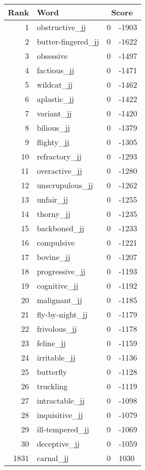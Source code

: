 \begin{longtable}[!htbp]{| rlr@{.}l |}
    \hline
    \textbf{Rank} & \textbf{Word} & \multicolumn{2}{c|}{\textbf{Score}} \\
    \hline
    \endhead
    1 & obstructive\_jj & 0 & -1903 \\
    2 & butter-fingered\_jj & 0 & -1622 \\
    3 & obsessive & 0 & -1497 \\
    4 & factious\_jj & 0 & -1471 \\
    5 & wildcat\_jj & 0 & -1462 \\
    6 & aplastic\_jj & 0 & -1422 \\
    7 & variant\_jj & 0 & -1420 \\
    8 & bilious\_jj & 0 & -1379 \\
    9 & flighty\_jj & 0 & -1305 \\
    10 & refractory\_jj & 0 & -1293 \\
    11 & overactive\_jj & 0 & -1280 \\
    12 & unscrupulous\_jj & 0 & -1262 \\
    13 & unfair\_jj & 0 & -1255 \\
    14 & thorny\_jj & 0 & -1235 \\
    15 & backboned\_jj & 0 & -1233 \\
    16 & compulsive & 0 & -1221 \\
    17 & bovine\_jj & 0 & -1207 \\
    18 & progressive\_jj & 0 & -1193 \\
    19 & cognitive\_jj & 0 & -1192 \\
    20 & malignant\_jj & 0 & -1185 \\
    21 & fly-by-night\_jj & 0 & -1179 \\
    22 & frivolous\_jj & 0 & -1178 \\
    23 & feline\_jj & 0 & -1159 \\
    24 & irritable\_jj & 0 & -1136 \\
    25 & butterfly & 0 & -1128 \\
    26 & truckling & 0 & -1119 \\
    27 & intractable\_jj & 0 & -1098 \\
    28 & inquisitive\_jj & 0 & -1079 \\
    29 & ill-tempered\_jj & 0 & -1069 \\
    30 & deceptive\_jj & 0 & -1059 \\
    1831 & carnal\_jj & 0 & 1030 \\

\end{longtable}
